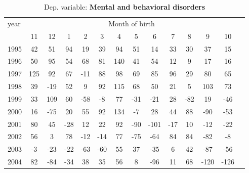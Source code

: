  \begin{table}[H] \begin{threeparttable} \centering \caption{Dep. variable: \textbf{Mental and behavioral disorders}} {\def\sym#1{\ifmmode^{#1}\else\(^{#1}\)\fi} \begin{tabular}{l*{13}{c}} \toprule year & \multicolumn{12}{c}{Month of birth} \\ \cmidrule(lr){2-13} 
            &          11&          12&           1&           2&           3&           4&           5&           6&           7&           8&           9&          10\\
1995        &          42&          51&          94&          19&          39&          94&          51&          14&          33&          30&          37&          15\\
1996        &          50&          95&          54&          68&          81&         140&          41&          54&          12&           9&          17&          16\\
1997        &         125&          92&          67&         -11&          88&          98&          69&          85&          96&          29&          80&          65\\
1998        &          39&         -19&          52&           9&          92&         115&          68&          50&          21&           5&         103&          73\\
1999        &          33&         109&          60&         -58&          -8&          77&         -31&         -21&          28&         -82&          19&         -46\\
2000        &          16&         -75&          20&          55&          92&         134&          -7&          28&          44&          88&         -90&         -53\\
2001        &          80&          45&         -28&          12&          22&          92&         -90&        -101&         -17&          10&         -12&         -22\\
2002        &          56&           3&          78&         -12&         -14&          77&         -75&         -64&          84&          84&         -82&          -8\\
2003        &          -3&         -23&         -22&         -63&         -60&          55&          37&         -35&           6&          42&         -87&         -56\\
2004        &          82&         -84&         -34&          38&          35&          56&           8&         -96&          11&          68&        -120&        -126\\

\end{tabular}}
\end{threeparttable}
\end{table}
